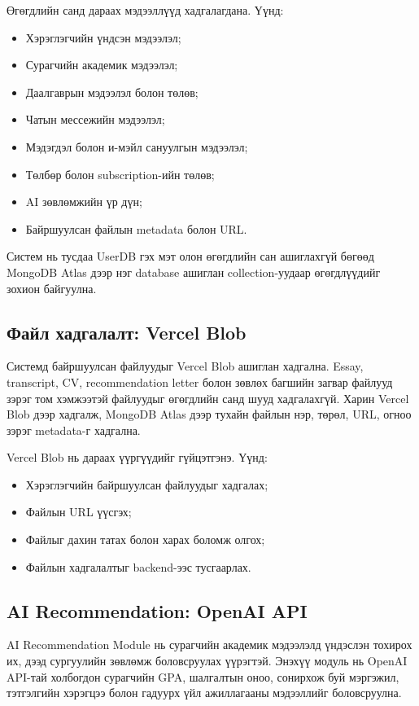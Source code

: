 Өгөгдлийн санд дараах мэдээллүүд хадгалагдана. Үүнд:

\begin{itemize}
    \item Хэрэглэгчийн үндсэн мэдээлэл;
    \item Сурагчийн академик мэдээлэл;
    \item Даалгаврын мэдээлэл болон төлөв;
    \item Чатын мессежийн мэдээлэл;
    \item Мэдэгдэл болон и-мэйл сануулгын мэдээлэл;
    \item Төлбөр болон subscription-ийн төлөв;
    \item AI зөвлөмжийн үр дүн;
    \item Байршуулсан файлын metadata болон URL.
\end{itemize}

Систем нь тусдаа UserDB гэх мэт олон өгөгдлийн сан ашиглахгүй бөгөөд
MongoDB Atlas дээр нэг database ашиглан collection-уудаар өгөгдлүүдийг
зохион байгуулна.

\subsection*{Файл хадгалалт: Vercel Blob}

Системд байршуулсан файлуудыг Vercel Blob ашиглан хадгална. Essay,
transcript, CV, recommendation letter болон зөвлөх багшийн загвар файлууд
зэрэг том хэмжээтэй файлуудыг өгөгдлийн санд шууд хадгалахгүй. Харин
Vercel Blob дээр хадгалж, MongoDB Atlas дээр тухайн файлын нэр, төрөл,
URL, огноо зэрэг metadata-г хадгална.

Vercel Blob нь дараах үүргүүдийг гүйцэтгэнэ. Үүнд:

\begin{itemize}
    \item Хэрэглэгчийн байршуулсан файлуудыг хадгалах;
    \item Файлын URL үүсгэх;
    \item Файлыг дахин татах болон харах боломж олгох;
    \item Файлын хадгалалтыг backend-ээс тусгаарлах.
\end{itemize}

\subsection*{AI Recommendation: OpenAI API}

AI Recommendation Module нь сурагчийн академик мэдээлэлд үндэслэн
тохирох их, дээд сургуулийн зөвлөмж боловсруулах үүрэгтэй. Энэхүү
модуль нь OpenAI API-тай холбогдон сурагчийн GPA, шалгалтын оноо,
сонирхож буй мэргэжил, тэтгэлгийн хэрэгцээ болон гадуурх үйл
ажиллагааны мэдээллийг боловсруулна.

